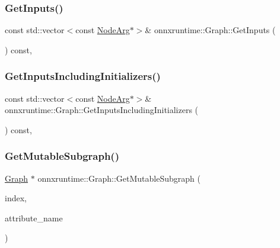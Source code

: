 \mbox{\label{classonnxruntime_1_1Graph_a902f1039ac6666c1eb912694d73336d9}} 
\subsubsection{\texorpdfstring{Get\+Inputs()}{GetInputs()}}
{\footnotesize\ttfamily const std\+::vector$<$const \mbox{\hyperlink{classonnxruntime_1_1NodeArg}{Node\+Arg}}$\ast$$>$\& onnxruntime\+::\+Graph\+::\+Get\+Inputs (\begin{DoxyParamCaption}{ }\end{DoxyParamCaption}) const\hspace{0.3cm}{\ttfamily [inline]}, {\ttfamily [noexcept]}}

\mbox{\label{classonnxruntime_1_1Graph_a8862e9a9d1e7f6ee12fab84e1763e125}} 
\subsubsection{\texorpdfstring{Get\+Inputs\+Including\+Initializers()}{GetInputsIncludingInitializers()}}
{\footnotesize\ttfamily const std\+::vector$<$const \mbox{\hyperlink{classonnxruntime_1_1NodeArg}{Node\+Arg}}$\ast$$>$\& onnxruntime\+::\+Graph\+::\+Get\+Inputs\+Including\+Initializers (\begin{DoxyParamCaption}{ }\end{DoxyParamCaption}) const\hspace{0.3cm}{\ttfamily [inline]}, {\ttfamily [noexcept]}}

\mbox{\label{classonnxruntime_1_1Graph_a6627ca765d7547bcd1e5fca2cd53233e}} 
\subsubsection{\texorpdfstring{Get\+Mutable\+Subgraph()}{GetMutableSubgraph()}}
{\footnotesize\ttfamily \mbox{\hyperlink{classonnxruntime_1_1Graph}{Graph}} $\ast$ onnxruntime\+::\+Graph\+::\+Get\+Mutable\+Subgraph (\begin{DoxyParamCaption}\item[{const \mbox{\hyperlink{namespaceonnxruntime_af8773b5c12b5d8fd9292eb2e268df760}{Node\+Index}}}]{index,  }\item[{const std\+::string \&}]{attribute\+\_\+name }\end{DoxyParamCaption})}

